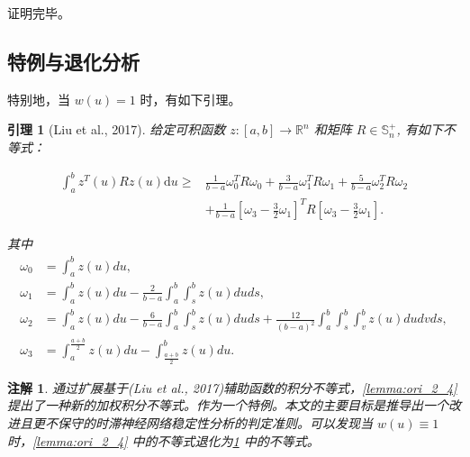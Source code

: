 \documentclass[a4paper, 12pt, oneside]{article}
\theoremstyle{cn_theorem}
\newtheorem{lemma}{引理}[section]   %
\newtheorem{remark}{注解}[section]  %
\begin{document}
证明完毕。

\subsection{特例与退化分析}
特别地，当 $w(u) = 1$ 时，有如下引理。

\begin{lemma}[Liu et al., 2017] \label{Liu2017}
给定可积函数 $z: [a,b] \to \mathbb{R}^n$ 和矩阵 $R \in \mathbb{S}_n^+$, 有如下不等式：

\begin{equation} \label{eq:lemma_integral_bound}
\begin{split}
    \int_a^b z^T(u) R z(u) \mathrm{d}u \ge & \frac{1}{b-a} \omega_0^T R \omega_0 + \frac{3}{b-a} \omega_1^T R \omega_1 + \frac{5}{b-a} \omega_2^T R \omega_2 \\
    & + \frac{1}{b-a} \left[ \omega_3 - \frac{3}{2} \omega_1 \right]^T R \left[ \omega_3 - \frac{3}{2} \omega_1 \right].
\end{split}
\end{equation}

其中
\begin{align*}
    \omega_0 &= \int_a^b z(u) du, \\
    \omega_1 &= \int_a^b z(u) du - \frac{2}{b-a} \int_a^b \int_s^b z(u) du ds, \\
    \omega_2 &= \int_a^b z(u) du - \frac{6}{b-a} \int_a^b \int_s^b z(u) du ds + \frac{12}{(b-a)^2} \int_a^b \int_s^b \int_v^b z(u) du dv ds, \\
    \omega_3 &= \int_a^{\frac{a+b}{2}} z(u) du - \int_{\frac{a+b}{2}}^b z(u) du.
\end{align*}
\end{lemma}

\begin{remark}
    通过扩展基于(Liu et al., 2017)辅助函数的积分不等式，\cref{lemma:ori_2_4} 提出了一种新的加权积分不等式。作为一个特例。本文的主要目标是推导出一个改进且更不保守的时滞神经网络稳定性分析的判定准则。可以发现当 $w(u) \equiv 1$ 时，\cref{lemma:ori_2_4} 中的不等式退化为\cref{Liu2017} 中的不等式。
\end{remark}
\end{document}
